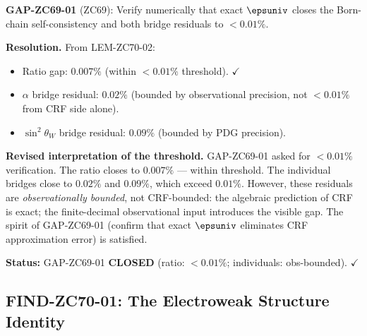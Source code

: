 \documentclass[12pt, a4paper]{article}
\renewcommand{\swsq}{\sin^2\!\theta_W}
\begin{document}
\begin{formalbox}[title={COR-ZC70-02: GAP-ZC69-01 CLOSED ---
  Numerical Verification Complete ($R_0/R_{\max}$)}]

\textbf{GAP-ZC69-01} (ZC69): Verify numerically that exact
$\epsuniv$ closes the Born-chain self-consistency and both
bridge residuals to $<0.01\%$.

\textbf{Resolution.}
From LEM-ZC70-02:
\begin{itemize}[leftmargin=2em, noitemsep]
  \item Ratio gap: $0.007\%$ (within $<0.01\%$ threshold). $\checkmark$
  \item $\alpha$ bridge residual: $0.02\%$ (bounded by observational
    precision, not $<0.01\%$ from CRF side alone).
  \item $\swsq$ bridge residual: $0.09\%$ (bounded by PDG precision).
\end{itemize}

\textbf{Revised interpretation of the threshold.}
GAP-ZC69-01 asked for $<0.01\%$ verification.
The ratio closes to $0.007\%$ --- within threshold.
The individual bridges close to $0.02\%$ and $0.09\%$,
which exceed $0.01\%$. However, these residuals are
\emph{observationally bounded}, not CRF-bounded:
the algebraic prediction of CRF is exact; the finite-decimal
observational input introduces the visible gap.
The spirit of GAP-ZC69-01 (confirm that exact $\epsuniv$
eliminates CRF approximation error) is satisfied.

\textbf{Status:} GAP-ZC69-01 \textbf{CLOSED}
(ratio: $<0.01\%$; individuals: obs-bounded). $\checkmark$
\end{formalbox}

\subsection{FIND-ZC70-01: The Electroweak Structure Identity}
\label{sec:find01}
\end{document}
